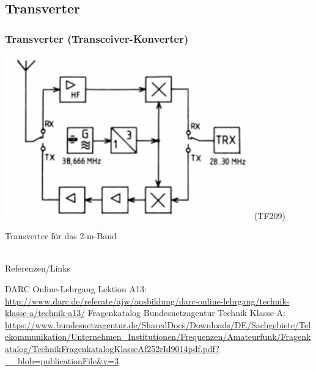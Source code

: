 \subsection{Transverter}

\begin{frame}
    \frametitle{Transverter (Transceiver-Konverter)}

    \begin{center}
        \includegraphics[width=0.8\textwidth,height=.7\textheight,keepaspectratio]{a13/TF209.png}
	{\tiny (TF209)}
    \end{center}

    Transverter für das 2-m-Band

\end{frame}

\renewcommand{\refname}{Referenzen}

\hypertarget{refs}{}
\textcolor{white}{} \\ %
\Large Referenzen/Links
\footnotesize

\begin{thebibliography}{}
      DARC Online-Lehrgang Lektion A13:
                    \url{http://www.darc.de/referate/ajw/ausbildung/darc-online-lehrgang/technik-klasse-a/technik-a13/}
     Fragenkatalog Bundesnetzagentur Technik Klasse A:\\
    \url{https://www.bundesnetzagentur.de/SharedDocs/Downloads/DE/Sachgebiete/Telekommunikation/Unternehmen_Institutionen/Frequenzen/Amateurfunk/Fragenkatalog/TechnikFragenkatalogKlasseAf252rId9014pdf.pdf?__blob=publicationFile&v=3}
\end{thebibliography}


